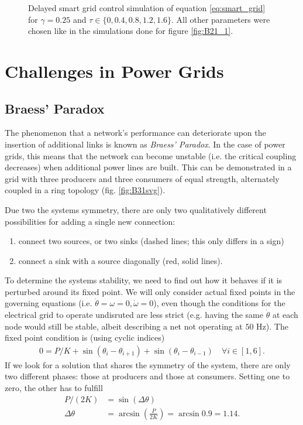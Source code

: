 \documentclass{scrartcl}
\begin{document}
\begin{figure}[h]
    \centering
    \caption{Delayed smart grid control simulation of equation
        \eqref{eq:smart_grid} for $\gamma = 0.25$ and $\tau\in \{0, 0.4,
        0.8, 1.2, 1.6\}$. All other parameters were chosen like in the
        simulations done for figure \ref{fig:B21_1}.}
    \label{fig:B23}
\end{figure}

\clearpage

\section{Challenges in Power Grids}
\subsection{Braess' Paradox}
The phenomenon that a network's performance can deteriorate upon the insertion of additional links is known as \emph{Braess' Paradox}. 
In the case of power grids, this means that the network can become unstable (i.e. the critical coupling decreases) when additional power lines are built. 
This can be demonstrated in a grid with three producers and three consumers of equal strength, alternately coupled in a ring topology (fig. \ref{fig:B31svg}). 

Due two the systems symmetry, there are only two qualitatively different possibilities for adding a single new connection:
\begin{enumerate}
 \item connect two sources, or two sinks (dashed lines; this only differs in a sign)
 \item connect a sink with a source diagonally (red, solid lines).
\end{enumerate}

To determine the systems stability, we need to find out how it behaves if
it is perturbed around its fixed point. We will only consider actual fixed
points in the governing equations (i.e. $\dot{\theta} = \omega = 0,
\dot{\omega} = 0$), even though the conditions for the electrical grid to
operate undisruted are less strict (e.g. having the same $\dot{\theta}$ at
each node would still be stable, albeit describing a net not operating at
$50$ Hz).
The fixed point condition is (using cyclic indices)
\begin{align}
 0 = P/K + \sin \left(\theta_i - \theta_{i+1} \right) + \sin \left(\theta_i - \theta_{i-1} \right) \quad \forall i \in \left[ 1, 6\right].
\end{align}
If we look for a solution that shares the symmetry of the system, there are
only two different phases: those at producers and those at consumers.
Setting one to zero, the other has to fulfill
\begin{align}
P/(2K) &= \sin \left( \Delta \theta \right)\\
\Delta \theta &= \arcsin \left( \frac{P}{2K}\right) = \arcsin{0.9} = 1.14.
\end{align}
 
\end{document}
